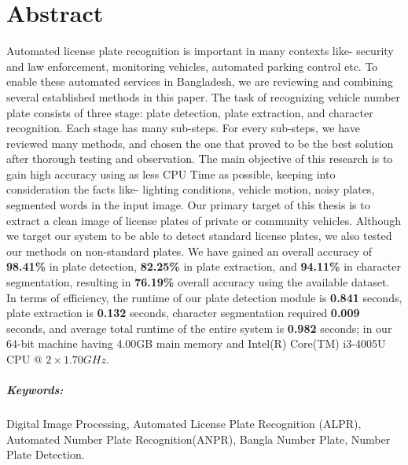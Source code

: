 \documentclass{standalone}
\begin{document}
\chapter*{Abstract}

Automated license plate recognition is important in many contexts like- security and law enforcement, monitoring vehicles, automated parking control etc. To enable these automated services in Bangladesh, we are reviewing and combining several established methods in this paper. The task of recognizing vehicle number plate consists of three stage: plate detection, plate extraction, and character recognition. Each stage has many sub-steps. For every sub-steps, we have reviewed many methods, and chosen the one that proved to be the best solution after thorough testing and observation. The main objective of this research is to gain high accuracy using as less CPU Time as possible, keeping into consideration the facts like- lighting conditions, vehicle motion, noisy plates, segmented words in the input image. Our primary target of this thesis is to extract a clean image of license plates of private or community vehicles. Although we target our system to be able to detect standard license plates, we also tested our methods on non-standard plates. We have gained an overall accuracy of {\bf 98.41\%} in plate detection, {\bf 82.25\%} in plate extraction, and {\bf 94.11\%} in character segmentation, resulting in {\bf 76.19\%} overall accuracy using the available dataset. In terms of efficiency, the runtime of our plate detection module is {\bf 0.841} seconds, plate extraction is {\bf 0.132} seconds, character segmentation required {\bf 0.009} seconds, and average total runtime of the entire system is {\bf 0.982} seconds; in our 64-bit machine having 4.00GB main memory and Intel(R) Core(TM) i3-4005U CPU @ $2 \times 1.70GHz$.

\vspace{1.0cm}

\paragraph*{Keywords:} Digital Image Processing, Automated License Plate Recognition (ALPR), Automated Number Plate Recognition(ANPR), Bangla Number Plate, Number Plate Detection.
\end{document}
